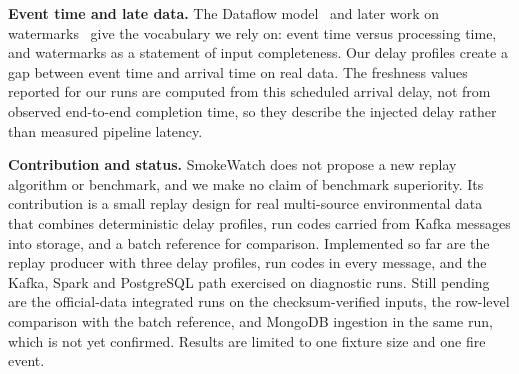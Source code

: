 \textbf{Event time and late data.} The Dataflow model~\cite{akidau2015} and later work on watermarks~\cite{akidau2021} give the vocabulary we rely on: event time versus processing time, and watermarks as a statement of input completeness. Our delay profiles create a gap between event time and arrival time on real data. The freshness values reported for our runs are computed from this scheduled arrival delay, not from observed end-to-end completion time, so they describe the injected delay rather than measured pipeline latency.

\textbf{Contribution and status.} SmokeWatch does not propose a new replay algorithm or benchmark, and we make no claim of benchmark superiority. Its contribution is a small replay design for real multi-source environmental data that combines deterministic delay profiles, run codes carried from Kafka messages into storage, and a batch reference for comparison. Implemented so far are the replay producer with three delay profiles, run codes in every message, and the Kafka, Spark and PostgreSQL path exercised on diagnostic runs. Still pending are the official-data integrated runs on the checksum-verified inputs, the row-level comparison with the batch reference, and MongoDB ingestion in the same run, which is not yet confirmed. Results are limited to one fixture size and one fire event.
